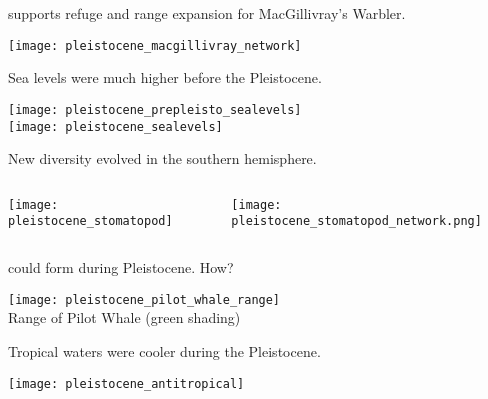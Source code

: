 \documentclass[t]{beamer}
\begin{document}
{
\begin{frame}[plain]
\end{frame}}

\begin{frame}{ supports refuge and range expansion for MacGillivray's Warbler.}
	\vspace{-\baselineskip}
	\begin{center}
		\texttt{[image: pleistocene\_macgillivray\_network]}
	\end{center}
\end{frame}

\begin{frame}{Sea levels were much higher before the Pleistocene.}
	\vspace{-\baselineskip}
	\begin{center}
		\texttt{[image: pleistocene\_prepleisto\_sealevels]}\\
		\texttt{[image: pleistocene\_sealevels]}\\
	\end{center}
\end{frame}

\begin{frame}[t]{New diversity evolved in the southern hemisphere.}
	\begin{columns}[T]
		\begin{column}{0.45\textwidth}
			\vspace{-\baselineskip}
			\begin{center}
				\texttt{[image: pleistocene\_stomatopod]}
			\end{center}
		\end{column}
		\begin{column}{0.45\textwidth}
			\vspace{-\baselineskip}
			\begin{center}
				\texttt{[image: pleistocene\_stomatopod\_network.png]}
			\end{center}
		\end{column}
	\end{columns}
\end{frame}

\begin{frame}{ could form during Pleistocene. How?}
	\vspace{-\baselineskip}
	\begin{center}
		\texttt{[image: pleistocene\_pilot\_whale\_range]}\\
		Range of Pilot Whale (green shading)\\
	\end{center}
\end{frame}

\begin{frame}{Tropical waters were cooler during the Pleistocene.}
	\vspace{-\baselineskip}
	\begin{center}
		\texttt{[image: pleistocene\_antitropical]}
	\end{center}
\end{frame}
\end{document}

